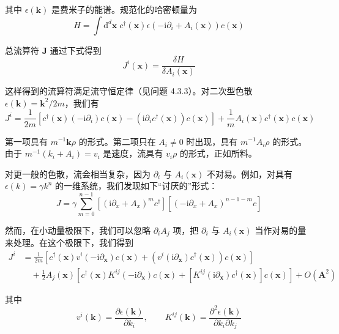其中 $\epsilon(\pmb{k})$ 是费米子的能谱。规范化的哈密顿量为
\begin{equation*}
H = \int \mathrm{d}^d\pmb{x}\; c^{\dagger}(\pmb{x})\epsilon(-\mathrm{i}\partial_i + A_i(\pmb{x}))c(\pmb{x}) \tag{4.3.4}
\end{equation*}

总流算符 $\pmb{J}$ 通过下式得到
\begin{equation*}
J^i(\pmb{x}) = \frac{\delta H}{\delta A_i(\pmb{x})} \tag{4.3.5}
\end{equation*}

这样得到的流算符满足流守恒定律（见问题 4.3.3）。对二次型色散 $\epsilon(\pmb{k})=\pmb{k}^2/2m$，我们有
\begin{equation*}
J^i = \frac{1}{2m}\left[c^{\dagger}(\pmb{x})(-\mathrm{i}\partial_i)c(\pmb{x}) - \left(\mathrm{i}\partial_i c^{\dagger}(\pmb{x})\right)c(\pmb{x})\right] + \frac{1}{m}A_i(\pmb{x})c^{\dagger}(\pmb{x})c(\pmb{x}) \tag{4.3.6}
\end{equation*}

第一项具有 $m^{-1}\pmb{k}\rho$ 的形式。第二项只在 $A_i\neq 0$ 时出现，具有 $m^{-1}A_i\rho$ 的形式。由于 $m^{-1}(k_i+A_i)=v_i$ 是速度，流具有 $v_i\rho$ 的形式，正如所料。

对更一般的色散，流会相当复杂，因为 $\partial_i$ 与 $A_i(\pmb{x})$ 不对易。例如，对具有 $\epsilon(k)=\gamma k^n$ 的一维系统，我们发现如下“讨厌的”形式：
\begin{equation*}
J = \gamma\sum_{m=0}^{n-1}\left[\left(\mathrm{i}\partial_x+A_x\right)^m c^{\dagger}\right]\left[\left(-\mathrm{i}\partial_x+A_x\right)^{n-1-m}c\right]
\end{equation*}

然而，在小动量极限下，我们可以忽略 $\partial_iA_j$ 项，把 $\partial_i$ 与 $A_i(\pmb{x})$ 当作对易的量来处理。在这个极限下，我们得到
\begin{align*}
J^i &= \frac{1}{2m}\left[c^{\dagger}(\pmb{x})v^i(-\mathrm{i}\partial_{\pmb{x}})c(\pmb{x}) + \left(v^i(\mathrm{i}\partial_{\pmb{x}})c^{\dagger}(\pmb{x})\right)c(\pmb{x})\right] \tag{4.3.7}\\
&\quad + \frac{1}{2}A_j(\pmb{x})\left[c^{\dagger}(\pmb{x})K^{ij}(-\mathrm{i}\partial_{\pmb{x}})c(\pmb{x}) + \left[K^{ij}(\mathrm{i}\partial_{\pmb{x}})c^{\dagger}(\pmb{x})\right]c(\pmb{x})\right] + O(\pmb{A}^2)
\end{align*}

其中
\begin{equation*}
v^i(\pmb{k}) = \frac{\partial\epsilon(\pmb{k})}{\partial k_i}, \qquad K^{ij}(\pmb{k}) = \frac{\partial^2\epsilon(\pmb{k})}{\partial k_i\partial k_j}
\end{equation*}

